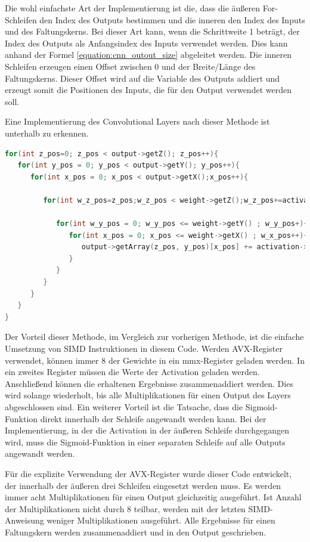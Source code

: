 \documentclass[../main.tex]{subfiles}
\begin{document}
Die wohl einfachste Art der Implementierung ist die, dass die äußeren For-Schleifen den Index des Outputs bestimmen und die inneren den Index des Inputs und des Faltungskerns. Bei dieser Art kann, wenn die Schrittweite 1 beträgt, der Index des Outputs als Anfangsindex des Inputs verwendet werden. Dies kann anhand der Formel \ref{equation:cnn_outout_size} abgeleitet werden. Die inneren Schleifen erzeugen einen Offset zwischen 0 und der Breite/Länge des Faltungskerns. Dieser Offset wird auf die Variable des Outputs addiert und erzeugt somit die Positionen des Inputs, die für den Output verwendet werden soll.

Eine Implementierung des Convolutional Layers nach dieser Methode ist unterhalb zu erkennen.
\begin{lstlisting}[language=c++, caption=Convolution: Output durchgehen, captionpos=b, label=listing:conv_output, frame=single, linewidth=\textwidth, breaklines=true]
for(int z_pos=0; z_pos < output->getZ(); z_pos++){
   for(int y_pos = 0; y_pos < output->getY(); y_pos++){
      for(int x_pos = 0; x_pos < output->getX();x_pos++){
      
         for(int w_z_pos=z_pos;w_z_pos < weight->getZ();w_z_pos+=activation->getZ()){
         
            for(int w_y_pos = 0; w_y_pos <= weight->getY() ; w_y_pos+){
               for(int x_pos = 0; x_pos <= weight->getX() ; w_x_pos++){
                  output->getArray(z_pos, y_pos)[x_pos] += activation->getArray(z_pos,y_pos+w_y_pos)[x_pos+w_x_pos] * weight->getArray(w_z_pos,w_y_rec)[w_x_rec];
               }
            }
         }
      }
   }
}
\end{lstlisting}

Der Vorteil dieser Methode, im Vergleich zur vorherigen Methode, ist die einfache Umsetzung von SIMD Instruktionen in diesem Code. Werden AVX-Register verwendet, können immer 8 der Gewichte in ein mmx-Register geladen werden. In ein zweites Register müssen die Werte der Activation geladen werden. Anschließend können die erhaltenen Ergebnisse zusammenaddiert werden. Dies wird solange wiederholt, bis alle Multiplikationen für einen Output des Layers abgeschlossen sind.
Ein weiterer Vorteil ist die Tatsache, dass die Sigmoid-Funktion direkt innerhalb der Schleife angewandt werden kann. Bei der Implementierung, in der die Activation in der äußeren Schleife durchgegangen wird, muss die Sigmoid-Funktion in einer separaten Schleife auf alle Outputs angewandt werden.

Für die explizite Verwendung der AVX-Register wurde dieser Code entwickelt, der innerhalb der äußeren drei Schleifen eingesetzt werden muss. Es werden immer acht Multiplikationen für einen Output gleichzeitig ausgeführt. Ist Anzahl der Multiplikationen nicht durch 8 teilbar, werden mit der letzten SIMD-Anweisung weniger Multiplikationen ausgeführt. Alle Ergebnisse für einen Faltungskern werden zusammenaddiert und in den Output geschrieben.
\end{document}

